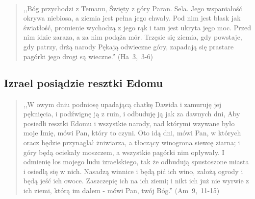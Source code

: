 \documentclass[10pt,a4paper,oneside]{article}
\begin{document}
\paragraph{}
\begin{quote}
,,Bóg przychodzi z Temanu, Święty z góry Paran. Sela. Jego wspaniałość okrywa niebiosa, a ziemia jest pełna jego chwały. Pod nim jest blask jak światłość, promienie wychodzą z jego rąk i tam jest ukryta jego moc. Przed nim idzie zaraza, a za nim podąża mór. Trzęsie się ziemia, gdy powstaje, gdy patrzy, drżą narody Pękają odwieczne góry, zapadają się prastare pagórki jego drogi są wieczne.'' \mbox{(Ha 3, 3-6)}
\end{quote}
\subsection{Izrael posiądzie resztki Edomu}
\paragraph{}
\begin{quote}
,,W owym dniu podniosę upadającą chatkę Dawida i zamuruję jej pęknięcia, i podźwignę ją z ruin, i odbuduję ją jak za dawnych dni, Aby posiedli resztki Edomu i wszystkie narody, nad którymi wzywane było moje Imię, mówi Pan, który to czyni. Oto idą dni, mówi Pan, w których oracz będzie przynaglał żniwiarza, a tłoczący winogrona siewcę ziarna; i góry będą ociekały moszczem, a wszystkie pagórki nim opływały. I odmienię los mojego ludu izraelskiego, tak że odbudują spustoszone miasta i osiedlą się w nich. Nasadzą winnice i będą pić ich wino, założą ogrody i będą jeść ich owoce. Zaszczepię ich na ich ziemi; i nikt ich już nie wyrwie z ich ziemi, którą im dałem - mówi Pan, twój Bóg.'' \mbox{(Am 9, 11-15)}
\end{quote}
\end{document}
